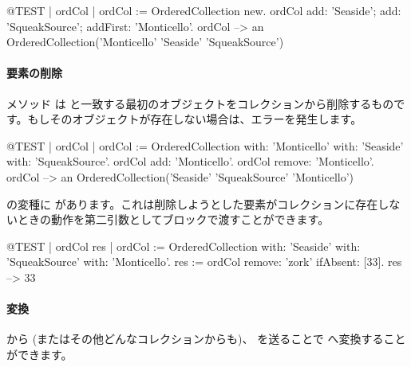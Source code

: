 \documentclass[a4paper,10pt,twoside]{book}
\begin{document}
\begin{code}{@TEST | ordCol |}
ordCol := OrderedCollection new.
ordCol add: 'Seaside'; add: 'SqueakSource'; addFirst: 'Monticello'.
ordCol --> an OrderedCollection('Monticello' 'Seaside' 'SqueakSource')
\end{code}

\paragraph{要素の削除} メソッド   は  と一致する最初のオブジェクトをコレクションから削除するものです。もしそのオブジェクトが存在しない場合は、エラーを発生します。

\begin{code}{@TEST | ordCol | ordCol := OrderedCollection with: 'Monticello' with: 'Seaside' with: 'SqueakSource'.}
ordCol add: 'Monticello'.
ordCol remove: 'Monticello'.
ordCol --> an OrderedCollection('Seaside' 'SqueakSource' 'Monticello')
\end{code}

 の変種に  があります。これは削除しようとした要素がコレクションに存在しないときの動作を第二引数としてブロックで渡すことができます。

\begin{code}{@TEST | ordCol res | ordCol := OrderedCollection with: 'Seaside' with: 'SqueakSource' with: 'Monticello'.}
res := ordCol remove: 'zork' ifAbsent: [33].
res --> 33
\end{code}

\paragraph{変換}
 から (またはその他どんなコレクションからも)、 を送ることで  へ変換することができます。


\end{document}
